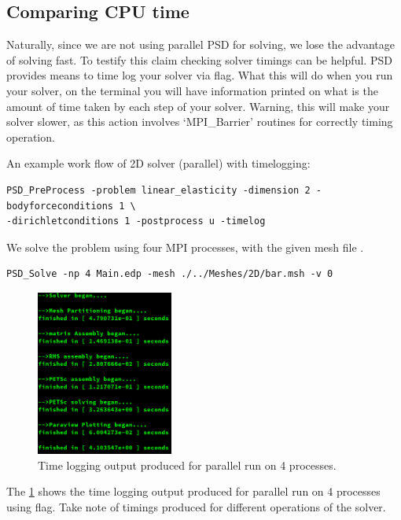 \subsection{Comparing CPU time}

Naturally, since we are not using parallel PSD for solving, we lose the
advantage of solving fast. To testify this claim checking solver timings
can be helpful. PSD provides means to time log your solver via
 flag. What this will do when you run your solver, on the
terminal you will have information printed on what is the amount of time
taken by each step of your solver. Warning, this will make your solver
slower, as this action involves `MPI\_Barrier' routines for correctly
timing operation.

An example work flow of 2D solver (parallel) with timelogging:

\begin{lstlisting}[style=BashInputStyle]
PSD_PreProcess -problem linear_elasticity -dimension 2 -bodyforceconditions 1 \
-dirichletconditions 1 -postprocess u -timelog
\end{lstlisting}

We solve the problem using four MPI processes, with the given mesh file
\psd{bar.msh}.

\begin{lstlisting}[style=BashInputStyle]
PSD_Solve -np 4 Main.edp -mesh ./../Meshes/2D/bar.msh -v 0
\end{lstlisting}

\begin{figure}[h!]
\centering
\includegraphics[width=0.4\textwidth]{./Images/le-time-par.png}
\caption{Time logging output produced for parallel run on 4 processes.\label{time-par-le}}
\end{figure}

The \cref{time-par-le} shows the time logging output produced for
parallel run on 4 processes using \psd{-timelog} flag. Take note of
timings produced for different operations of the solver.

